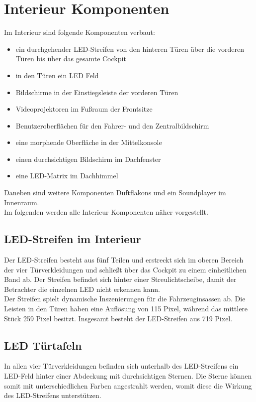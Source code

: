 \section{Interieur Komponenten}
Im Interieur sind folgende Komponenten verbaut:
\begin{itemize}
	\item ein durchgehender LED-Streifen von den hinteren Türen über die vorderen Türen bis über das gesamte Cockpit
	\item in den Türen ein LED Feld
	\item Bildschirme in der Einstiegsleiste der vorderen Türen
	\item Videoprojektoren im Fußraum der Frontsitze
	\item Benutzeroberflächen für den Fahrer- und den Zentralbildschirm
	\item eine morphende Oberfläche in der Mittelkonsole
	\item einen durchsichtigen Bildschirm im Dachfenster
	\item eine LED-Matrix im Dachhimmel
\end{itemize}
Daneben sind weitere Komponenten Duftflakons und ein Soundplayer im Innenraum. \\
Im folgenden werden alle Interieur Komponenten näher vorgestellt.
\subsection{LED-Streifen im Interieur}
Der LED-Streifen besteht aus fünf Teilen und erstreckt sich im oberen Bereich der vier Türverkleidungen und schließt über das Cockpit zu einem einheitlichen Band ab. Der Streifen befindet sich hinter einer Streulichtscheibe, damit der Betrachter die einzelnen LED nicht erkennen kann. \\
Der Streifen spielt dynamische Inszenierungen für die Fahrzeuginsassen ab.
Die Leisten in den Türen haben eine Auflösung von 115 Pixel, während das mittlere Stück 259 Pixel besitzt. Insgesamt besteht der LED-Streifen aus 719 Pixel.
\subsection{LED Türtafeln}
In allen vier Türverkleidungen befinden sich unterhalb des LED-Streifens ein LED-Feld hinter einer Abdeckung mit durchsichtigen Sternen. Die Sterne können somit mit unterschiedlichen Farben angestrahlt werden, womit diese die Wirkung des LED-Streifens unterstützen. \\
